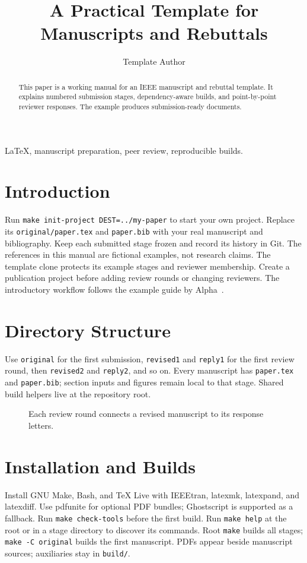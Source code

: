 \documentclass[journal]{IEEEtran}
\title{A Practical Template for Manuscripts and Rebuttals}
\author{Template Author}
\begin{document}
\maketitle
\begin{abstract}
This paper is a working manual for an IEEE manuscript and rebuttal template.
It explains numbered submission stages, dependency-aware builds, and point-by-point reviewer responses.
The example produces submission-ready documents.
\end{abstract}
\begin{IEEEkeywords}
LaTeX, manuscript preparation, peer review, reproducible builds.
\end{IEEEkeywords}
\section{Introduction}
Run \texttt{make init-project DEST=../my-paper} to start your own project.
Replace its \texttt{original/paper.tex} and \texttt{paper.bib} with your real manuscript
and bibliography. Keep each submitted stage frozen and record its history in Git.
The references in this manual are fictional examples, not research claims.
The template clone protects its example stages and reviewer membership.
Create a publication project before adding review rounds or changing reviewers.
The introductory workflow follows the example guide by Alpha~\cite{guide}.
\section{Directory Structure}
Use \texttt{original} for the first submission, \texttt{revised1} and \texttt{reply1}
for the first review round, then \texttt{revised2} and \texttt{reply2}, and so on.
Every manuscript has \texttt{paper.tex} and \texttt{paper.bib}; section inputs and figures
remain local to that stage. Shared build helpers live at the repository root.
\begin{figure}[!b]
\centering

\caption{Each review round connects a revised manuscript to its response letters.}
\label{fig:workflow}
\end{figure}
\section{Installation and Builds}
Install GNU Make, Bash, and TeX Live with IEEEtran, latexmk, latexpand, and latexdiff.
Use pdfunite for optional PDF bundles; Ghostscript is supported as a fallback.
Run \texttt{make check-tools} before the first build.
Run \texttt{make help} at the root or in a stage directory to discover its commands.
Root \texttt{make} builds all stages; \texttt{make -C original} builds the first manuscript.
PDFs appear beside manuscript sources; auxiliaries stay in \texttt{build/}.

\end{document}
